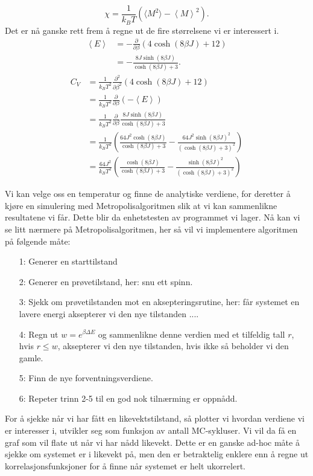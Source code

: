 \documentclass[norsk, 10pt]{article}
\def\mean#1{\left\langle #1 \right\rangle}
\def\para#1{\left( #1 \right)}
\begin{document}
$$ \chi = \frac{1}{k_BT}(\langle M^2\rangle - \mean M^2).$$
Det er nå ganske rett frem å regne ut de fire størrelsene vi er interessert i.
\begin{align*}
	\mean E &= -\frac{\partial}{\partial \beta} (4\cosh(8\beta J) + 12) \\
	&= -\frac{8J\sinh(8\beta J)}{\cosh(8\beta J) + 3}.
\end{align*}
\begin{align*}
	C_V &= \frac{1}{k_BT^2}\frac{\partial^2}{\partial \beta^2} (4\cosh(8\beta J) + 12) \\
	&= \frac{1}{k_BT^2}\frac{\partial}{\partial \beta} (-\mean E) \\
	&= \frac{1}{k_BT^2}\frac{\partial}{\partial \beta}\frac{8J\sinh(8\beta J)}{\cosh(8\beta J) + 3} \\
	&= \frac{1}{k_BT^2}\para{\frac{64J^2\cosh(8\beta J)}{\cosh(8\beta J) + 3} - \frac{64J^2\sinh(8\beta J)^2}{(\cosh(8\beta J) + 3)^2}} \\
	&= \frac{64J^2}{k_BT^2}\para{\frac{\cosh(8\beta J)}{\cosh(8\beta J) + 3} - \frac{\sinh(8\beta J)^2}{(\cosh(8\beta J) + 3)^2}}
\end{align*}


Vi kan velge oss en temperatur og finne de analytiske verdiene, for deretter å kjøre en simulering med Metropolisalgoritmen slik at vi kan sammenlikne resultatene vi får. Dette blir da enhetstesten av programmet vi lager. Nå kan vi se litt nærmere på Metropolisalgoritmen, her så vil vi implementere algoritmen på følgende måte:
\begin{itemize}
\item[1:] Generer en starttilstand
\item[2:] Generer en prøvetilstand, her: snu ett spinn.
\item[3:] Sjekk om prøvetilstanden mot en aksepteringsrutine, her: får systemet en lavere energi aksepterer vi den nye tilstanden ....
\item[4:] Regn ut $w=e^{\beta\Delta E}$ og sammenlikne denne verdien med et tilfeldig tall $r$, hvis $r\leq w$, aksepterer vi den nye tilstanden, hvis ikke så beholder vi den gamle.
\item[5:] Finn de nye forventningsverdiene.
\item[6:] Repeter trinn 2-5 til en god nok tilnærming er oppnådd.
\end{itemize}
For å sjekke når vi har fått en likevektstilstand, så plotter vi hvordan verdiene vi er interesser i, utvikler seg som funksjon av antall MC-sykluser. Vi vil da få en graf som vil flate ut når vi har nådd likevekt. Dette er en ganske ad-hoc måte å sjekke om systemet er i likevekt på, men den er betraktelig enklere enn å regne ut korrelasjonsfunksjoner for å finne når systemet er helt ukorrelert.
\end{document}
